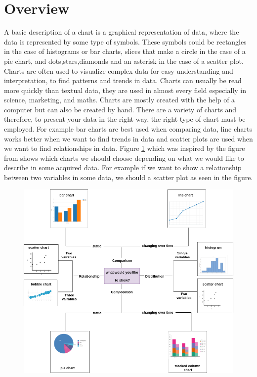 \documentclass[12pt, a4paper,oneside]{report}
\begin{document}
\section{Overview} 
A basic description of a chart is a graphical representation of data, where the data is represented by some type of symbols. These symbols could be rectangles in the case of histograms or bar charts,  slices that make a circle in the case of a pie chart, and dots,stars,diamonds and an asterisk in the case of a scatter plot.
Charts are often used to visualize complex data for easy understanding and interpretation, to find patterns and trends in data. Charts can usually be read more quickly than textual data, they are used in almost every field especially in science, marketing, and maths. Charts are mostly created with the help of a computer but can also be created by hand. There are a variety of charts and therefore, to present your data in the right way, the right type of chart must be employed. For example bar charts are best used when comparing data, line charts works better when we want to find trends in data and scatter plots are used when we want to find relationships in data. Figure \ref{fig:chartse} which was inspired by the figure from \cite{chartselection} shows which charts we should choose depending on what we would like to describe in some acquired data. For example if we want to show a relationship between two variables in some data, we should a scatter plot as seen in the figure.\\

\begin{figure}[!htb]
	\centering
	\includegraphics [scale=0.5] {chart}
	\label{fig:chartse}
\end{figure}
\end{document}
